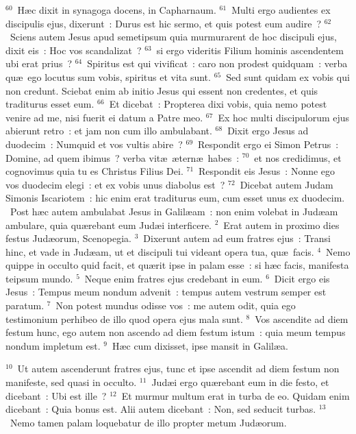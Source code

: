 ${}^{60}$~H\ae c dixit in synagoga docens, in Capharnaum.
${}^{61}$~Multi ergo audientes ex discipulis ejus, dixerunt~: Durus est hic sermo, et quis potest eum audire~?
${}^{62}$~Sciens autem Jesus apud semetipsum quia murmurarent de hoc discipuli ejus, dixit eis~: Hoc vos scandalizat~?
${}^{63}$~si ergo videritis Filium hominis ascendentem ubi erat prius~?
${}^{64}$~Spiritus est qui vivificat~: caro non prodest quidquam~: verba qu\ae\ ego locutus sum vobis, spiritus et vita sunt.
${}^{65}$~Sed sunt quidam ex vobis qui non credunt. Sciebat enim ab initio Jesus qui essent non credentes, et quis traditurus esset eum.
${}^{66}$~Et dicebat~: Propterea dixi vobis, quia nemo potest venire ad me, nisi fuerit ei datum a Patre meo.
${}^{67}$~Ex hoc multi discipulorum ejus abierunt retro~: et jam non cum illo ambulabant.
${}^{68}$~Dixit ergo Jesus ad duodecim~: Numquid et vos vultis abire~?
${}^{69}$~Respondit ergo ei Simon Petrus~: Domine, ad quem ibimus~? verba vit\ae\ \ae tern\ae\ habes~:
${}^{70}$~et nos credidimus, et cognovimus quia tu es Christus Filius Dei.
${}^{71}$~Respondit eis Jesus~: Nonne ego vos duodecim elegi~: et ex vobis unus diabolus est~?
${}^{72}$~Dicebat autem Judam Simonis Iscariotem~: hic enim erat traditurus eum, cum esset unus ex duodecim.
~Post h\ae c autem ambulabat Jesus in Galil\ae am~: non enim volebat in Jud\ae am ambulare, quia qu\ae rebant eum Jud\ae i interficere.
${}^{2}$~Erat autem in proximo dies festus Jud\ae orum, Scenopegia.
${}^{3}$~Dixerunt autem ad eum fratres ejus~: Transi hinc, et vade in Jud\ae am, ut et discipuli tui videant opera tua, qu\ae\ facis.
${}^{4}$~Nemo quippe in occulto quid facit, et qu\ae rit ipse in palam esse~: si h\ae c facis, manifesta teipsum mundo.
${}^{5}$~Neque enim fratres ejus credebant in eum.
${}^{6}$~Dicit ergo eis Jesus~: Tempus meum nondum advenit~: tempus autem vestrum semper est paratum.
${}^{7}$~Non potest mundus odisse vos~: me autem odit, quia ego testimonium perhibeo de illo quod opera ejus mala sunt.
${}^{8}$~Vos ascendite ad diem festum hunc, ego autem non ascendo ad diem festum istum~: quia meum tempus nondum impletum est.
${}^{9}$~H\ae c cum dixisset, ipse mansit in Galil\ae a.


${}^{10}$~Ut autem ascenderunt fratres ejus, tunc et ipse ascendit ad diem festum non manifeste, sed quasi in occulto.
${}^{11}$~Jud\ae i ergo qu\ae rebant eum in die festo, et dicebant~: Ubi est ille~?
${}^{12}$~Et murmur multum erat in turba de eo. Quidam enim dicebant~: Quia bonus est. Alii autem dicebant~: Non, sed seducit turbas.
${}^{13}$~Nemo tamen palam loquebatur de illo propter metum Jud\ae orum.


